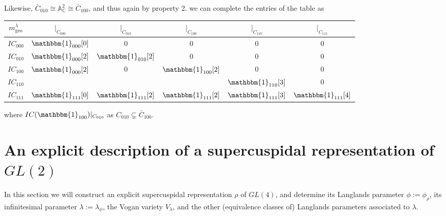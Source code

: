 \documentclass{memoir}
\newcommand{\ba}{\mathbb{A}}
\newcommand{\bc}{\mathbb{C}}
\newcommand{\tx}{\text}
\theoremstyle{definition}
\begin{document}
	Likewise, $\bar{C}_{010}\cong \ba_{\bc}^2\cong\bar{C}_{100}$, and thus again by property 2. we can complete the entries of the table as 
	\begin{center}
	\begin{tabular}{ c c c c c c}
		$m_{\tx{geo}}^\lambda$ & $|_{C_{000}}$ & $|_{C_{010}}$ & $|_{C_{100}}$ & $|_{C_{110}}$ & $|_{C_{111}}$ \\
		\hline 
		$IC_{000}$ & $\mathbbm{1}_{000}[0]$ & 0 & 0 & 0 & 0\\
		$IC_{010}$ & $\mathbbm{1}_{000}[2]$ & $\mathbbm{1}_{010}[2]$ & 0 & 0 & 0 \\
		$IC_{100}$ & $\mathbbm{1}_{000}[2]$ & 0 & $\mathbbm{1}_{100}[2]$ & 0 & 0 \\
		$IC_{110}$ &  &  &  & $\mathbbm{1}_{110}[3]$ & 0 \\
		$IC_{111}$ & $\mathbbm{1}_{111}[0]$ & $\mathbbm{1}_{111}[2]$ & $\mathbbm{1}_{111}[2]$ & $\mathbbm{1}_{111}[3]$ & $\mathbbm{1}_{111}[4]$ \\
	\end{tabular}
\end{center}
%
	where $IC(\mathbbm{1}_{100})|_{C_{010}}$ as $C_{010}\subsetneq \bar{C}_{100}$.  
	
	
	
	
	


	
	\section{An explicit description of a supercuspidal representation of $GL(2)$}
	
	In this section we will construct an explicit supercuspidal representation $\rho$ of $GL(4)$, and determine its Langlands parameter $\phi:=\phi_\rho$, its infinitesimal parameter $\lambda:=\lambda_\phi$, the Vogan variety $V_\lambda$, and the other (equivalence classes of) Langlands parameters associated to $\lambda$.  
	
\end{document}
